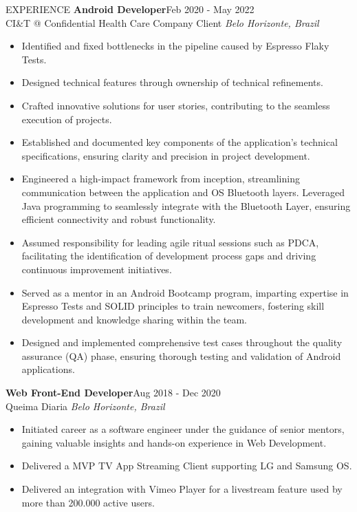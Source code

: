 \documentclass{template/faangpath}
\begin{document}
\begin{rSection}{EXPERIENCE}
\textbf{Android Developer}\hfill Feb 2020 - May 2022\\
	CI\&T @ Confidential Health Care Company Client \hfill \textit{Belo Horizonte, Brazil}
 \begin{itemize}
    \itemsep -3pt {} 
    \item Identified and fixed bottlenecks in the pipeline caused by Espresso Flaky Tests.
    \item Designed technical features through ownership of technical refinements. 
		\item Crafted innovative solutions for user stories, contributing to the seamless execution of projects.
		\item Established and documented key components of the application's technical specifications, 
			ensuring clarity and precision in project development.
	 	\item Engineered a high-impact framework from inception, streamlining communication between the 
			application and OS Bluetooth layers. Leveraged Java programming to seamlessly integrate with 
			the Bluetooth Layer, ensuring efficient connectivity and robust functionality. 
		\item Assumed responsibility for leading agile ritual sessions such as PDCA, facilitating the 
			identification of development process gaps and driving continuous improvement initiatives.
		\item Served as a mentor in an Android Bootcamp program, imparting expertise in Espresso Tests 
			and SOLID principles to train newcomers, fostering skill development and knowledge sharing within the team.
		\item Designed and implemented comprehensive test cases throughout the quality assurance (QA) phase, 
			ensuring thorough testing and validation of Android applications.
	\end{itemize}

\textbf{Web Front-End Developer}\hfill Aug 2018 - Dec 2020\\
	Queima Diaria \hfill \textit{Belo Horizonte, Brazil}
 \begin{itemize}
    \itemsep -3pt {} 
    \item Initiated career as a software engineer under the guidance of senior mentors, 
		gaining valuable insights and hands-on experience in Web Development.    
		\item Delivered a MVP TV App Streaming Client supporting LG and Samsung OS.
		\item Delivered an integration with Vimeo Player for a livestream feature used by
			more than 200.000 active users.
	\end{itemize}

\end{rSection} 
\end{document}
